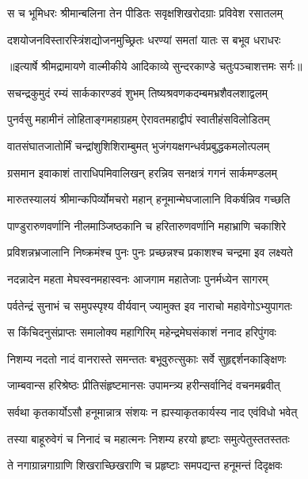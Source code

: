 \twolineshloka
{स च भूमिधरः श्रीमान्बलिना तेन पीडितः}
{सवृक्षशिखरोदग्राः प्रविवेश रसातलम्} %

\twolineshloka
{दशयोजनविस्तारस्त्रिंशद्योजनमुच्छ्रितः}
{धरण्यां समतां यातः स बभूव धराधरः} %


{॥इत्यार्षे श्रीमद्रामायणे वाल्मीकीये आदिकाव्ये सुन्दरकाण्डे चतुःपञ्चाशत्तमः सर्गः॥}


\twolineshloka
{सचन्द्रकुमुदं रम्यं सार्ककारण्डवं शुभम्}
{तिष्यश्रवणकदम्बमभ्रशैवलशाद्वलम्} %

\twolineshloka
{पुनर्वसु महामीनं लोहिताङ्गमहाग्रहम्}
{ऐरावतमहाद्वीपं स्वातीहंसविलोडितम्} %

\twolineshloka
{वातसंघातजातोर्मिं चन्द्रांशुशिशिराम्बुमत्}
{भुजंगयक्षगन्धर्वप्रबुद्धकमलोत्पलम्} %

\twolineshloka
{ग्रसमान इवाकाशं ताराधिपमिवालिखन्}
{हरन्निव सनक्षत्रं गगनं सार्कमण्डलम्} %

\twolineshloka
{मारुतस्यालयं श्रीमान्कपिर्व्योमचरो महान्}
{हनूमान्मेघजालानि विकर्षन्निव गच्छति} %

\twolineshloka
{पाण्डुरारुणवर्णानि नीलमाञ्जिष्ठकानि च}
{हरितारुणवर्णानि महाभ्राणि चकाशिरे} %

\twolineshloka
{प्रविशन्नभ्रजालानि निष्क्रमंश्च पुनः पुनः}
{प्रच्छन्नश्च प्रकाशश्च चन्द्रमा इव लक्ष्यते} %

\twolineshloka
{नदन्नादेन महता मेघस्वनमहास्वनः}
{आजगाम महातेजाः पुनर्मध्येन सागरम्} %

\twolineshloka
{पर्वतेन्द्रं सुनाभं च समुपस्पृश्य वीर्यवान्}
{ज्यामुक्त इव नाराचो महावेगोऽभ्युपागतः} %

\twolineshloka
{स किंचिदनुसंप्राप्तः समालोक्य महागिरिम्}
{महेन्द्रमेघसंकाशं ननाद हरिपुंगवः} %

\twolineshloka
{निशम्य नदतो नादं वानरास्ते समन्ततः}
{बभूवुरुत्सुकाः सर्वे सुहृद्दर्शनकाङ्क्षिणः} %

\twolineshloka
{जाम्बवान्स हरिश्रेष्ठः प्रीतिसंहृष्टमानसः}
{उपामन्त्र्य हरीन्सर्वानिदं वचनमब्रवीत्} %

\twolineshloka
{सर्वथा कृतकार्योऽसौ हनूमान्नात्र संशयः}
{न ह्यस्याकृतकार्यस्य नाद एवंविधो भवेत्} %

\twolineshloka
{तस्या बाहूरुवेगं च निनादं च महात्मनः}
{निशम्य हरयो हृष्टाः समुत्पेतुस्ततस्ततः} %

\twolineshloka
{ते नगाग्रान्नगाग्राणि शिखराच्छिखराणि च}
{प्रहृष्टाः समपद्यन्त हनूमन्तं दिदृक्षवः} %

